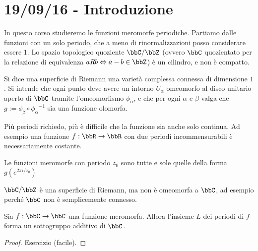 \chapter{19/09/16 - Introduzione}
\justify

In questo corso studieremo le funzioni meromorfe periodiche.
Partiamo dalle funzioni con un solo periodo, che a meno di rinormalizzazioni posso considerare essere $1$.
Lo spazio topologico quoziente $\bbC / \bbZ$ (ovvero $\bbC$ quozientato per la relazione di
equivalenza $a\textit{R}b \sse a-b \in \bbZ$) è un cilindro, e non è compatto.

\begin{definizione}
Si dice una superficie di Riemann una varietà complessa connessa di dimensione $1$.
Si intende che ogni punto deve avere un intorno $U_\alpha$ omeomorfo al disco unitario aperto di $\bbC$
tramite l'omeomorfismo $\phi_\alpha$, e che per ogni $\alpha$ e $\beta$ valga che $g:=\phi_\beta \circ {\phi_\alpha}^{-1}$
sia una funzione olomorfa.
\end{definizione}


\begin{osservazione}
Più periodi richiedo, più è difficile che la funzione sia anche solo continua. Ad esempio una funzione
$f: \bbR \rar \bbR$ con due periodi incommensurabili è necessariamente costante.
\end{osservazione}

\begin{lemma}
Le funzioni meromorfe con periodo $z_0$ sono tutte e sole quelle della forma $g\left(e^{2\pi i/z_0}\right)$
\end{lemma}

\begin{osservazione}
$\bbC / \bbZ$ è una superficie di Riemann, ma non è omeomorfa a $\bbC$, ad esempio perché $\bbC$ non è semplicemente connesso.
\end{osservazione}

\begin{lemma}
Sia $f: \bbC \rar \bbC$ una funzione meromorfa. Allora l'insieme $L$ dei periodi di $f$
forma un sottogruppo additivo di $\bbC$.
\end{lemma}
\begin{proof}
Esercizio (facile).
\end{proof}

